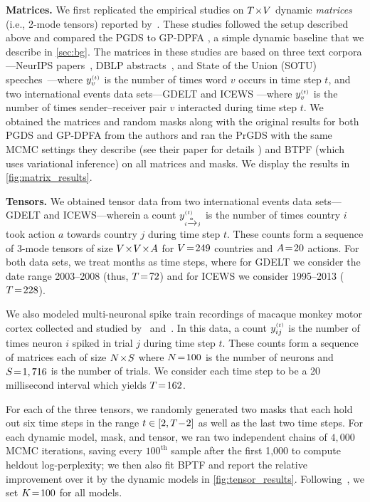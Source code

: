 \documentclass{article}
\begin{document}
\textbf{Matrices.} We first replicated the empirical studies on $T\!\times\! V$ dynamic \emph{matrices} (i.e., 2-mode tensors) reported by~\citet{schein2016poisson}. These studies followed the setup described above and compared the PGDS to GP-DPFA \cite{acharya2015nonparametric}, a simple dynamic baseline that we describe in \cref{sec:bg}. The matrices in these studies are based on three text corpora---NeurIPS papers~\cite{neuripscorpus}, DBLP abstracts~\cite{dblp}, and State of the Union (SOTU) speeches~\cite{sotu}---where $\yvt$ is the number of times word $v$ occurs in time step $t$, and two international events data sets---GDELT \cite{leetaru2013gdelt} and ICEWS \cite{boscheeicews}---where $\yvt$ is the number of times sender--receiver pair $v$ interacted during time step $t$. We obtained the matrices and random masks along with the original results for both PGDS and GP-DPFA from the authors and ran the PrGDS with the same MCMC settings they describe (see their paper for details \cite{schein2016poisson}) and BTPF (which uses variational inference) on all matrices and masks. We display the results in \cref{fig:matrix_results}.~

\textbf{Tensors.} We obtained tensor data from two international events data sets---GDELT and ICEWS---wherein a count $y_{\mathsmaller{i \xrightarrow{a}j}}^{\mathsmaller{(t)}}$ is the number of times country $i$ took action $a$ towards country $j$ during time step $t$. These counts form a sequence of 3-mode tensors of size $V \!\times\! V \!\times\! A$ for $V \!=\! 249$ countries and $A \!=\! 20$ actions. For both data sets, we treat months as time steps, where for GDELT we consider the date range 2003--2008 (thus, $T \!=\! 72$) and for ICEWS we consider 1995--2013 ($T \!=\! 228$). 

We also modeled multi-neuronal spike train recordings of macaque monkey motor cortex collected and studied by~\citet{vyas2018neural} and~\citet{williams2018unsupervised}.  In this data, a count $y^{\mathsmaller{(t)}}_{ij}$ is the number of times neuron $i$ spiked in trial $j$ during time step $t$. These counts form a sequence of matrices each of size $N \!\times\! S$ where $N \!=\! 100$ is the number of neurons and $S \!=\! 1,716$ is the number of trials. We consider each time step to be a 20 millisecond interval which yields $T \!=\! 162$. 

For each of the three tensors, we randomly generated two masks that each hold out six time steps in the range $t \in [2, T\!-\! 2]$ as well as the last two time steps. For each dynamic model, mask, and tensor, we ran two independent chains of $4,000$ MCMC iterations, saving every $100^{\textrm{th}}$ sample after the first 1,000 to compute heldout log-perplexity; we then also fit BPTF and report the relative improvement over it by the dynamic models in \cref{fig:tensor_results}. Following~\citet{schein2016poisson}, we set $K \!=\! 100$ for all models.~
\end{document}
